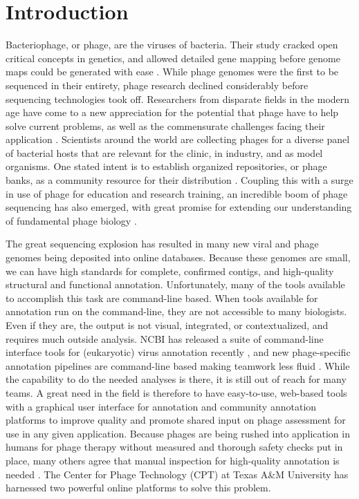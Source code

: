 \section*{Introduction}

Bacteriophage, or phage, are the viruses of bacteria. Their study
cracked open critical concepts in genetics, and allowed detailed gene
mapping before genome maps could be generated with ease \cite{Ofir_2018,Salmond_2015}. While
phage genomes were the first to be sequenced in their entirety, phage
research declined considerably before sequencing technologies took off.
Researchers from disparate fields in the modern age have come to a new
appreciation for the potential that phage have to help solve current
problems, as well as the commensurate challenges facing their
application \cite{Young_2015}. Scientists around the world are collecting phages
for a diverse panel of bacterial hosts that are relevant for the clinic,
in industry, and as model organisms. One stated intent is to establish
organized repositories, or phage banks, as a community resource for
their distribution \cite{Pirnay_2018,Pouillot_2010}. Coupling this with a surge in use of phage
for education and research training, an incredible boom of phage
sequencing has also emerged, with great promise for extending our
understanding of fundamental phage biology \cite{Hatfull_2011}.

The great sequencing explosion has resulted in many new viral \cite{Brister_2014}
and phage genomes being deposited into online databases. Because these
genomes are small, we can have high standards for complete, confirmed
contigs, and high-quality structural and functional annotation.
Unfortunately, many of the tools available to accomplish this task are
command-line based. When tools available for annotation run on the
command-line, they are not accessible to many biologists. Even if they
are, the output is not visual, integrated, or contextualized, and
requires much outside analysis. NCBI has released a suite of
command-line interface tools for (eukaryotic) virus annotation recently
\cite{Shean_2019}, and new phage-specific annotation pipelines are command-line
based making teamwork less fluid \cite{Ecale_Zhou_2019}. While the capability to do the
needed analyses is there, it is still out of reach for many teams. A
great need in the field is therefore to have easy-to-use, web-based
tools with a graphical user interface for annotation and community
annotation platforms to improve quality and promote shared input on
phage assessment for use in any given application. Because phages are
being rushed into application in humans for phage therapy without
measured and thorough safety checks put in place, many others agree that
manual inspection for high-quality annotation is needed \cite{Philipson_2018}. The
Center for Phage Technology (CPT) at Texas A\&M University has harnessed
two powerful online platforms to solve this problem.

